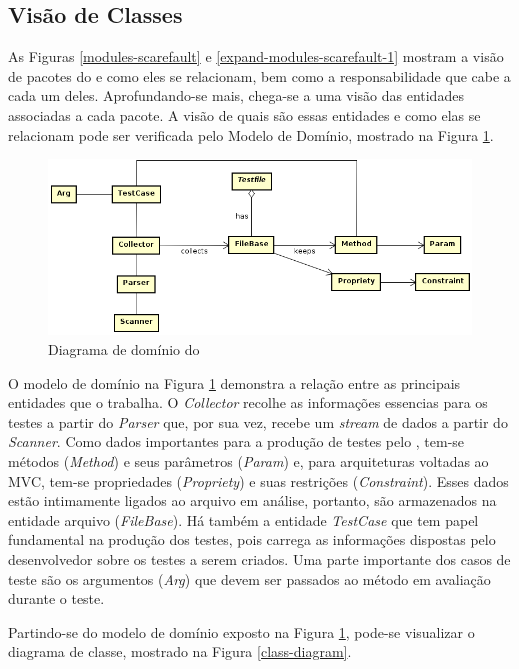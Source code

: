\subsection{Visão de Classes}
As Figuras \ref{modules-scarefault} e \ref{expand-modules-scarefault-1} mostram
a visão de pacotes do \scarefault e como eles se relacionam, bem como a
responsabilidade que cabe a cada um deles. Aprofundando-se mais, chega-se a uma
visão das entidades associadas a cada pacote. A visão de quais são essas
entidades e como elas se relacionam pode ser verificada pelo Modelo de 
Domínio, mostrado na Figura \ref{domain-diagram}.
\begin{figure}[h]
  \centering
    \includegraphics[width=\textwidth]{figuras/domain-diagram.png}
    \caption{Diagrama de domínio do \scarefault}
    \label{domain-diagram}
\end{figure}
\FloatBarrier

O modelo de domínio na Figura \ref{domain-diagram} demonstra a relação
entre as principais entidades que o \framework trabalha. O \textit{Collector}
recolhe as  informações essencias para os testes a partir do
\textit{Parser} que, por sua vez, recebe um \textit{stream} de dados a partir
do \textit{Scanner}. Como dados importantes para a produção de testes pelo
\Scarefault, tem-se métodos (\textit{Method}) e seus parâmetros (\textit{Param})
e, para arquiteturas voltadas ao MVC, tem-se propriedades (\textit{Propriety})
e suas restrições (\textit{Constraint}). Esses dados estão intimamente ligados
ao arquivo em análise, portanto, são armazenados na entidade arquivo (\textit{FileBase}).
Há também a entidade \textit{TestCase} que tem papel fundamental na produção
dos testes, pois carrega as informações dispostas pelo desenvolvedor sobre os
testes a serem criados. Uma parte importante dos casos de teste são os
argumentos (\textit{Arg}) que devem ser passados ao método em avaliação durante o
teste.

Partindo-se do modelo de domínio exposto na Figura \ref{domain-diagram}, pode-se
visualizar o diagrama de classe, mostrado na Figura \ref{class-diagram}.

